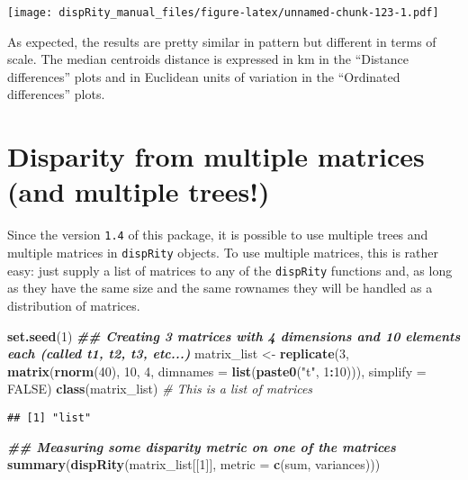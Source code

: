 \documentclass[
]{book}
\newenvironment{Shaded}{\begin{snugshade}}{\end{snugshade}}
\newcommand{\AttributeTok}[1]{\textcolor[rgb]{0.13,0.29,0.53}{#1}}
\newcommand{\CommentTok}[1]{\textcolor[rgb]{0.56,0.35,0.01}{\textit{#1}}}
\newcommand{\ConstantTok}[1]{\textcolor[rgb]{0.56,0.35,0.01}{#1}}
\newcommand{\DecValTok}[1]{\textcolor[rgb]{0.00,0.00,0.81}{#1}}
\newcommand{\DocumentationTok}[1]{\textcolor[rgb]{0.56,0.35,0.01}{\textbf{\textit{#1}}}}
\newcommand{\FunctionTok}[1]{\textcolor[rgb]{0.13,0.29,0.53}{\textbf{#1}}}
\newcommand{\NormalTok}[1]{#1}
\newcommand{\OtherTok}[1]{\textcolor[rgb]{0.56,0.35,0.01}{#1}}
\newcommand{\SpecialCharTok}[1]{\textcolor[rgb]{0.81,0.36,0.00}{\textbf{#1}}}
\newcommand{\StringTok}[1]{\textcolor[rgb]{0.31,0.60,0.02}{#1}}
\begin{document}
\texttt{[image: dispRity\_manual\_files/figure-latex/unnamed-chunk-123-1.pdf]}

As expected, the results are pretty similar in pattern but different in terms of scale.
The median centroids distance is expressed in km in the ``Distance differences'' plots and in Euclidean units of variation in the ``Ordinated differences'' plots.

\hypertarget{multi.input}{%
\section{Disparity from multiple matrices (and multiple trees!)}\label{multi.input}}

Since the version \texttt{1.4} of this package, it is possible to use multiple trees and multiple matrices in \texttt{dispRity} objects.
To use multiple matrices, this is rather easy: just supply a list of matrices to any of the \texttt{dispRity} functions and, as long as they have the same size and the same rownames they will be handled as a distribution of matrices.

\begin{Shaded}
\begin{Highlighting}[]
\FunctionTok{set.seed}\NormalTok{(}\DecValTok{1}\NormalTok{)}
\DocumentationTok{\#\# Creating 3 matrices with 4 dimensions and 10 elements each (called t1, t2, t3, etc...)}
\NormalTok{matrix\_list }\OtherTok{\textless{}{-}} \FunctionTok{replicate}\NormalTok{(}\DecValTok{3}\NormalTok{, }\FunctionTok{matrix}\NormalTok{(}\FunctionTok{rnorm}\NormalTok{(}\DecValTok{40}\NormalTok{), }\DecValTok{10}\NormalTok{, }\DecValTok{4}\NormalTok{, }\AttributeTok{dimnames =} \FunctionTok{list}\NormalTok{(}\FunctionTok{paste0}\NormalTok{(}\StringTok{"t"}\NormalTok{, }\DecValTok{1}\SpecialCharTok{:}\DecValTok{10}\NormalTok{))),}
                         \AttributeTok{simplify =} \ConstantTok{FALSE}\NormalTok{)}
\FunctionTok{class}\NormalTok{(matrix\_list) }\CommentTok{\# This is a list of matrices}
\end{Highlighting}
\end{Shaded}

\begin{verbatim}
## [1] "list"
\end{verbatim}

\begin{Shaded}
\begin{Highlighting}[]
\DocumentationTok{\#\# Measuring some disparity metric on one of the matrices}
\FunctionTok{summary}\NormalTok{(}\FunctionTok{dispRity}\NormalTok{(matrix\_list[[}\DecValTok{1}\NormalTok{]], }\AttributeTok{metric =} \FunctionTok{c}\NormalTok{(sum, variances)))}
\end{Highlighting}
\end{Shaded}
\end{document}
